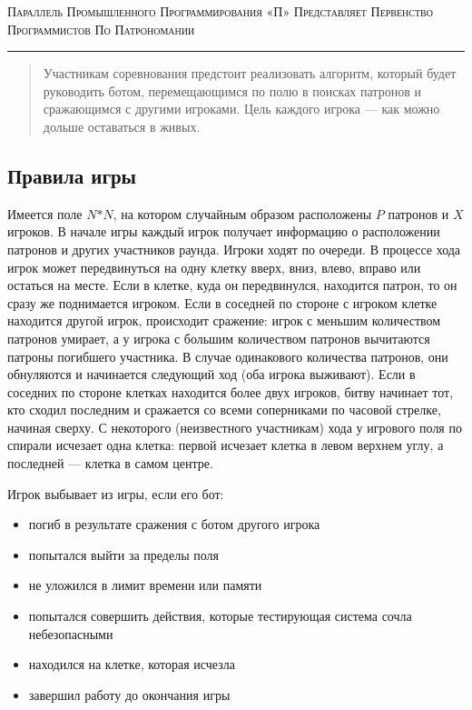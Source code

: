 \documentclass[a4paper,12pt]{article}
\begin{document}
\begin{center}
{\small\textsc{Параллель Промышленного Программирования «П» Представляет Первенство Программистов По Патрономании}}
\vskip 1pt \hrule \vskip 3pt

\end{center}
\begin{abstract}
Участникам соревнования предстоит реализовать алгоритм, который будет руководить ботом, перемещающимся по полю в поисках патронов и сражающимся с другими игроками. Цель каждого игрока — как можно дольше оставаться в живых.
\end{abstract}
\subsection{Правила игры}
Имеется поле $N$$*$$N$, на котором случайным образом расположены $P$ патронов и $X$ игроков. В начале игры каждый игрок получает информацию о расположении патронов и других участников раунда. Игроки ходят по очереди. В процессе хода игрок может передвинуться на одну клетку вверх, вниз, влево, вправо или остаться на месте. Если в клетке, куда он передвинулся, находится патрон, то он сразу же поднимается игроком. Если в соседней по стороне с игроком клетке находится другой игрок, происходит сражение: игрок с меньшим количеством патронов умирает, а у игрока с большим количеством патронов вычитаются патроны погибшего участника. В случае одинакового количества патронов, они обнуляются и начинается следующий ход (оба игрока выживают). Если в соседних по стороне клетках находится более двух игроков, битву начинает тот, кто сходил последним и сражается со всеми соперниками по часовой стрелке, начиная сверху. С некоторого (неизвестного участникам) хода у игрового поля по спирали исчезает одна клетка: первой исчезает клетка в левом верхнем углу, а последней — клетка в самом центре.
\begin{flushleft}
Игрок выбывает из игры, если его бот:
\begin{itemize}
\item погиб в результате сражения с ботом другого игрока
\item попытался выйти за пределы поля
\item не уложился в лимит времени или памяти
\item попытался совершить действия, которые тестирующая система сочла небезопасными
\item находился на клетке, которая исчезла
\item завершил работу до окончания игры
\end{itemize}
\end{flushleft}
\end{document}
